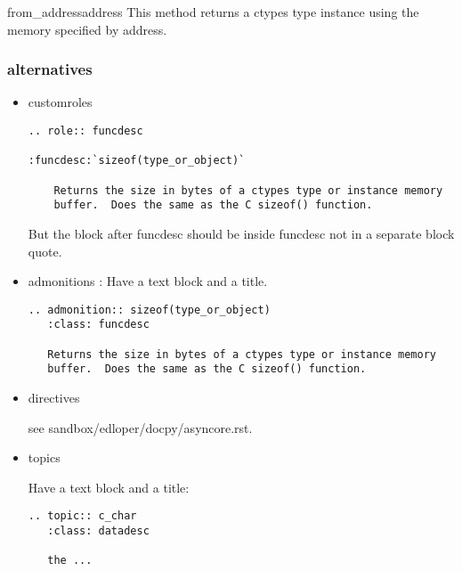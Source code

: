 \begin{methoddesc}{from_address}{address}
This method returns a ctypes type instance using the memory
specified by address.
\end{methoddesc}


\subsubsection{alternatives\label{-alternatives}}
\begin{itemize}
\item {} 
customroles
\begin{verbatim}
.. role:: funcdesc

:funcdesc:`sizeof(type_or_object)`

    Returns the size in bytes of a ctypes type or instance memory
    buffer.  Does the same as the C sizeof() function.
\end{verbatim}

But the block after funcdesc should be inside funcdesc not in a separate
block quote.

\item {} 
admonitions :
Have a text block and a title.
\begin{verbatim}
.. admonition:: sizeof(type_or_object)
   :class: funcdesc

   Returns the size in bytes of a ctypes type or instance memory
   buffer.  Does the same as the C sizeof() function.
\end{verbatim}

\item {} 
directives

see sandbox/edloper/docpy/asyncore.rst.

\item {} 
topics

Have a text block and a title:
\begin{verbatim}
.. topic:: c_char
   :class: datadesc

   the ...
\end{verbatim}

\end{itemize}

